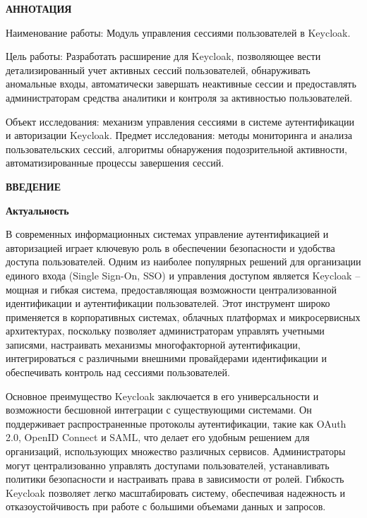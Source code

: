 \newpage
\begin{center}
  \textbf{\large АННОТАЦИЯ}
\end{center}


Наименование работы: Модуль управления сессиями пользователей в Keycloak.

Цель работы: Разработать расширение для Keycloak, позволяющее вести детализированный учет активных сессий пользователей, обнаруживать аномальные входы, автоматически завершать неактивные сессии и предоставлять администраторам средства аналитики и контроля за активностью пользователей.

Объект исследования: механизм управления сессиями в системе аутентификации и авторизации Keycloak.
Предмет исследования: методы мониторинга и анализа пользовательских сессий, алгоритмы обнаружения подозрительной активности, автоматизированные процессы завершения сессий.

\onehalfspacing
\setcounter{page}{2}

\newpage
\renewcommand{\contentsname}{\centerline{\large СОДЕРЖАНИЕ}}
\tableofcontents

\newpage
\begin{center}
  \textbf{\large ВВЕДЕНИЕ}
\end{center}


\textbf{Актуальность}

В современных информационных системах управление аутентификацией и авторизацией играет ключевую роль в обеспечении безопасности и удобства доступа пользователей. Одним из наиболее популярных решений для организации единого входа (Single Sign-On, SSO) и управления доступом является Keycloak – мощная и гибкая система, предоставляющая возможности централизованной идентификации и аутентификации пользователей. Этот инструмент широко применяется в корпоративных системах, облачных платформах и микросервисных архитектурах, поскольку позволяет администраторам управлять учетными записями, настраивать механизмы многофакторной аутентификации, интегрироваться с различными внешними провайдерами идентификации и обеспечивать контроль над сессиями пользователей.

Основное преимущество Keycloak заключается в его универсальности и возможности бесшовной интеграции с существующими системами. Он поддерживает распространенные протоколы аутентификации, такие как OAuth 2.0, OpenID Connect и SAML, что делает его удобным решением для организаций, использующих множество различных сервисов. Администраторы могут централизованно управлять доступами пользователей, устанавливать политики безопасности и настраивать права в зависимости от ролей. Гибкость Keycloak позволяет легко масштабировать систему, обеспечивая надежность и отказоустойчивость при работе с большими объемами данных и запросов.

